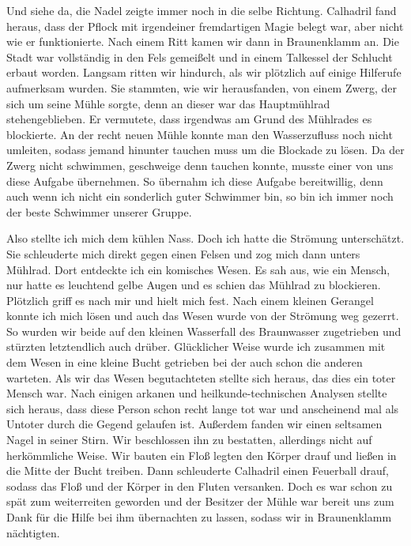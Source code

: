 Und siehe da, die Nadel zeigte immer noch in die selbe Richtung. Calhadril fand heraus, dass der Pflock mit irgendeiner fremdartigen Magie belegt war, aber nicht wie er funktionierte. Nach einem Ritt kamen wir dann in Braunenklamm an. Die Stadt war vollständig in den Fels gemeißelt und in einem Talkessel der Schlucht erbaut worden. Langsam ritten wir hindurch, als wir plötzlich auf einige Hilferufe aufmerksam wurden. Sie stammten, wie wir herausfanden, von einem Zwerg, der sich um seine Mühle sorgte, denn an dieser war das Hauptmühlrad stehengeblieben. Er vermutete, dass irgendwas am Grund des Mühlrades es blockierte. An der recht neuen Mühle konnte man den Wasserzufluss noch nicht umleiten, sodass jemand hinunter tauchen muss um die Blockade zu lösen. Da der Zwerg nicht schwimmen, geschweige denn tauchen konnte, musste einer von uns diese Aufgabe übernehmen. So übernahm ich diese Aufgabe bereitwillig, denn auch wenn ich nicht ein sonderlich guter Schwimmer bin, so bin ich immer noch der beste Schwimmer unserer Gruppe. 


Also stellte ich mich dem kühlen Nass. Doch ich hatte die Strömung unterschätzt. Sie schleuderte mich direkt gegen einen Felsen und zog mich dann unters Mühlrad. Dort entdeckte ich ein komisches Wesen. Es sah aus, wie ein Mensch, nur hatte es leuchtend gelbe Augen und es schien das Mühlrad zu blockieren. Plötzlich griff es nach mir und hielt mich fest. Nach einem kleinen Gerangel konnte ich mich lösen und auch das Wesen wurde von der Strömung weg gezerrt. So wurden wir beide auf den kleinen Wasserfall des Braunwasser zugetrieben und stürzten letztendlich auch drüber. Glücklicher Weise wurde ich zusammen mit dem Wesen in eine kleine Bucht getrieben bei der auch schon die anderen warteten. Als wir das Wesen begutachteten stellte sich heraus, das dies ein toter Mensch war. Nach einigen arkanen und heilkunde-technischen Analysen stellte sich heraus, dass diese Person schon recht lange tot war und anscheinend mal als Untoter durch die Gegend gelaufen ist. Außerdem fanden wir einen seltsamen Nagel in seiner Stirn. Wir beschlossen ihn zu bestatten, allerdings nicht auf herkömmliche Weise. Wir bauten ein Floß legten den Körper drauf und ließen in die Mitte der Bucht treiben. Dann schleuderte Calhadril einen Feuerball drauf, sodass das Floß und der Körper in den Fluten versanken. Doch es war schon zu spät zum weiterreiten geworden und der Besitzer der Mühle war bereit uns zum Dank für die Hilfe bei ihm übernachten zu lassen, sodass wir in Braunenklamm nächtigten.

